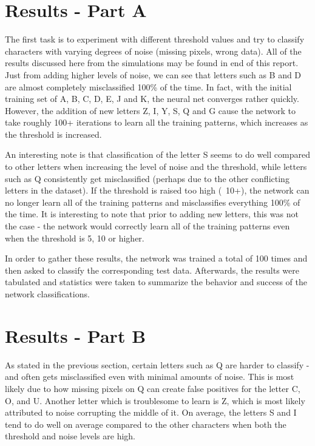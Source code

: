 \documentclass{article}
\begin{document}
\section{Results - Part A}

The first task is to experiment with different threshold values and try to classify characters with varying degrees of noise (missing pixels, wrong data). All of the results discussed here from the simulations may be found in end of this report. Just from adding higher levels of noise, we can see that letters such as B and D are almost completely misclassified 100\% of the time. In fact, with the initial training set of A, B, C, D, E, J and K, the neural net converges rather quickly. However, the addition of new letters Z, I, Y, S, Q and G cause the network to take roughly 100+ iterations to learn all the training patterns, which increases as the threshold is increased.

An interesting note is that classification of the letter S seems to do well compared to other letters when increasing the level of noise and the threshold, while letters such as Q consistently get misclassified (perhaps due to the other conflicting letters in the dataset). If the threshold is raised too high (~10+), the network can no longer learn all of the training patterns and misclassifies everything 100\% of the time. It is interesting to note that prior to adding new letters, this was not the case - the network would correctly learn all of the training patterns even when the threshold is 5, 10 or higher.

In order to gather these results, the network was trained a total of 100 times and then asked to classify the corresponding test data. Afterwards, the results were tabulated and statistics were taken to summarize the behavior and success of the network classifications.

\section{Results - Part B}

As stated in the previous section, certain letters such as Q are harder to classify - and often gets misclassified even with minimal amounts of noise. This is most likely due to how missing pixels on Q can create false positives for the letter C, O, and U.  Another letter which is troublesome to learn is Z, which is most likely attributed to noise corrupting the middle of it. On average, the letters S and I tend to do well on average compared to the other characters when both the threshold and noise levels are high.
\end{document}
